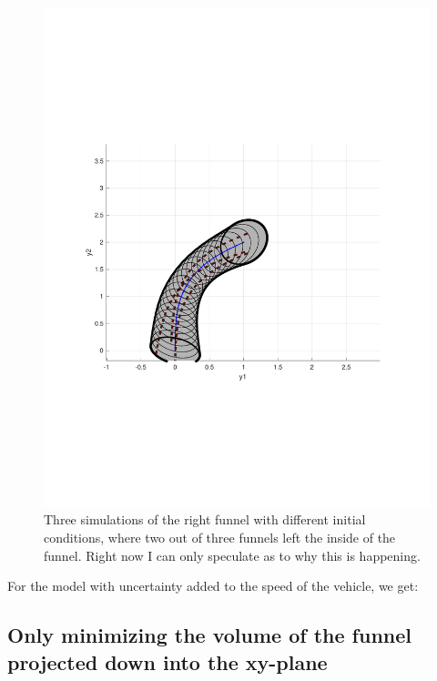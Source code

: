 \begin{figure}
  \includegraphics[scale=0.5]{figures/funnel/right_simulation}
  \caption{Three simulations of the right funnel with different initial
    conditions, where two out of three funnels left the inside of the funnel.
    Right now I can only speculate as to why this is happening.}
\end{figure} 

For the model with uncertainty added to the speed of the vehicle, we get:

\subsection{Only minimizing the volume of the funnel projected down into the xy-plane}

